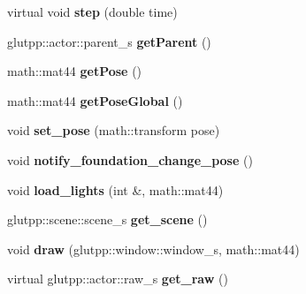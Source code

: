 \begin{DoxyCompactItemize}
\item 
\hypertarget{classglutpp_1_1actor_1_1actor_ae264fd9182e417cc3d954e91f326f3af}{virtual void {\bfseries step} (double time)}\label{classglutpp_1_1actor_1_1actor_ae264fd9182e417cc3d954e91f326f3af}

\item 
\hypertarget{classglutpp_1_1actor_1_1actor_a0bc6eedd6edf5f24534d8b87c2da5de1}{glutpp\-::actor\-::parent\-\_\-s {\bfseries get\-Parent} ()}\label{classglutpp_1_1actor_1_1actor_a0bc6eedd6edf5f24534d8b87c2da5de1}

\item 
\hypertarget{classglutpp_1_1actor_1_1actor_a72e8f023672a73fcc6499fa0f2f42dbe}{math\-::mat44 {\bfseries get\-Pose} ()}\label{classglutpp_1_1actor_1_1actor_a72e8f023672a73fcc6499fa0f2f42dbe}

\item 
\hypertarget{classglutpp_1_1actor_1_1actor_a4629f61093831a4eb8853bcc57816be7}{math\-::mat44 {\bfseries get\-Pose\-Global} ()}\label{classglutpp_1_1actor_1_1actor_a4629f61093831a4eb8853bcc57816be7}

\item 
\hypertarget{classglutpp_1_1actor_1_1actor_a830d8f4bf43f3f436545e8b9ff73dac5}{void {\bfseries set\-\_\-pose} (math\-::transform pose)}\label{classglutpp_1_1actor_1_1actor_a830d8f4bf43f3f436545e8b9ff73dac5}

\item 
\hypertarget{classglutpp_1_1actor_1_1actor_a25274295ccfff15c00d9dcabc1dd6192}{void {\bfseries notify\-\_\-foundation\-\_\-change\-\_\-pose} ()}\label{classglutpp_1_1actor_1_1actor_a25274295ccfff15c00d9dcabc1dd6192}

\item 
\hypertarget{classglutpp_1_1actor_1_1actor_a77d1b7dc02d9b39398acff7422eb4b1d}{void {\bfseries load\-\_\-lights} (int \&, math\-::mat44)}\label{classglutpp_1_1actor_1_1actor_a77d1b7dc02d9b39398acff7422eb4b1d}

\item 
\hypertarget{classglutpp_1_1actor_1_1actor_ab16316902e38071888ce842da9c93436}{glutpp\-::scene\-::scene\-\_\-s {\bfseries get\-\_\-scene} ()}\label{classglutpp_1_1actor_1_1actor_ab16316902e38071888ce842da9c93436}

\item 
\hypertarget{classglutpp_1_1actor_1_1actor_a7079c42ff56468e9fe46aea22d929494}{void {\bfseries draw} (glutpp\-::window\-::window\-\_\-s, math\-::mat44)}\label{classglutpp_1_1actor_1_1actor_a7079c42ff56468e9fe46aea22d929494}

\item 
\hypertarget{classglutpp_1_1actor_1_1actor_aaaa1656e46cf18d003f6d08d3eb0d097}{virtual glutpp\-::actor\-::raw\-\_\-s {\bfseries get\-\_\-raw} ()}\label{classglutpp_1_1actor_1_1actor_aaaa1656e46cf18d003f6d08d3eb0d097}

\end{DoxyCompactItemize}
